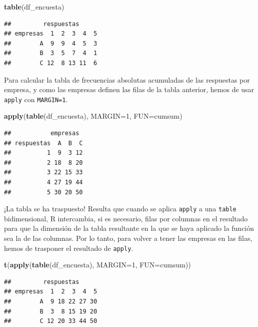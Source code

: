 \documentclass[]{book}
\newenvironment{Shaded}{\begin{snugshade}}{\end{snugshade}}
\newcommand{\DataTypeTok}[1]{\textcolor[rgb]{0.13,0.29,0.53}{#1}}
\newcommand{\DecValTok}[1]{\textcolor[rgb]{0.00,0.00,0.81}{#1}}
\newcommand{\KeywordTok}[1]{\textcolor[rgb]{0.13,0.29,0.53}{\textbf{#1}}}
\newcommand{\NormalTok}[1]{#1}
\theoremstyle{definition}
\theoremstyle{definition}
\theoremstyle{definition}
\theoremstyle{remark}
\begin{document}
\begin{Shaded}
\begin{Highlighting}[]
\KeywordTok{table}\NormalTok{(df_encuesta)}
\end{Highlighting}
\end{Shaded}

\begin{verbatim}
##         respuestas
## empresas  1  2  3  4  5
##        A  9  9  4  5  3
##        B  3  5  7  4  1
##        C 12  8 13 11  6
\end{verbatim}

Para calcular la tabla de frecuencias absolutas acumuladas de las respuestas por empresa, y como las empresas definen las filas de la tabla anterior, hemos de usar \texttt{apply} con \texttt{MARGIN=1}.

\begin{Shaded}
\begin{Highlighting}[]
\KeywordTok{apply}\NormalTok{(}\KeywordTok{table}\NormalTok{(df_encuesta), }\DataTypeTok{MARGIN=}\DecValTok{1}\NormalTok{, }\DataTypeTok{FUN=}\NormalTok{cumsum)}
\end{Highlighting}
\end{Shaded}

\begin{verbatim}
##           empresas
## respuestas  A  B  C
##          1  9  3 12
##          2 18  8 20
##          3 22 15 33
##          4 27 19 44
##          5 30 20 50
\end{verbatim}

¡La tabla se ha traspuesto!
Resulta que cuando se aplica \texttt{apply} a una \texttt{table} bidimensional, R intercambia, si es necesario, filas por columnas en el resultado para que la dimensión de la tabla resultante en la que se haya aplicado la función sea la de las columnas. Por lo tanto, para volver a tener las empresas en las filas, hemos de trasponer el resultado de \texttt{apply}.

\begin{Shaded}
\begin{Highlighting}[]
\KeywordTok{t}\NormalTok{(}\KeywordTok{apply}\NormalTok{(}\KeywordTok{table}\NormalTok{(df_encuesta), }\DataTypeTok{MARGIN=}\DecValTok{1}\NormalTok{, }\DataTypeTok{FUN=}\NormalTok{cumsum))}
\end{Highlighting}
\end{Shaded}

\begin{verbatim}
##         respuestas
## empresas  1  2  3  4  5
##        A  9 18 22 27 30
##        B  3  8 15 19 20
##        C 12 20 33 44 50
\end{verbatim}
\end{document}

